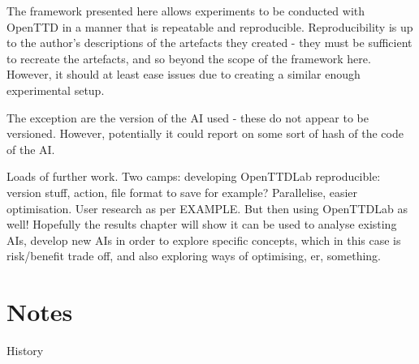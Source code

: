 \documentclass[logo,msc,dsti]{infthesis}    %
\begin{document}
The framework presented here allows experiments to be conducted with OpenTTD in a manner that is repeatable and reproducible. Reproducibility is up to the author's descriptions of the artefacts they created - they must be sufficient to recreate the artefacts, and so beyond the scope of the framework here. However, it should at least ease issues due to creating a similar enough experimental setup.

The exception are the version of the AI used - these do not appear to be versioned. However, potentially it could report on some sort of hash of the code of the AI.

Loads of further work. Two camps: developing OpenTTDLab reproducible: version stuff, action, file format to save for example? Parallelise, easier optimisation. User research as per EXAMPLE. But then using OpenTTDLab as well! Hopefully the results chapter will show it can be used to analyse existing AIs, develop new AIs in order to explore specific concepts, which in this case is risk/benefit trade off, and also exploring ways of optimising, er, something.

\chapter{Notes}

History
\end{document}
